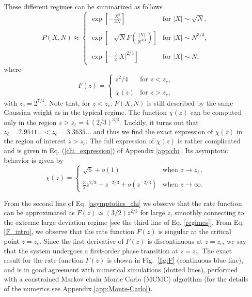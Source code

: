 \documentclass[aps,pre,twocolumn,superscriptaddress,showpacs]{revtex4-1}
\newcommand{\be}{\begin{equation}}
\newcommand{\ee}{\end{equation}}
\begin{document}
These different regimes can be summarized as follows
\be
P(X,N)\approx
\begin{cases}
\exp\left[-\frac{ X^2}{4  N}\right]& \text{for } |X|\sim \sqrt{N},\\
\\

\exp\left[-\sqrt{N}F \left(\frac{ |X|}{ N^{3/4}}\right) \right]& \text{for } |X|\sim N^{3/4},\\
\\
\exp\left[-\frac{3}{2} {|X|}^{2/3}\right]& \text{for } |X|\sim N,
\end{cases}
\label{regimes}
\ee
where 
\be
F(z)=
\begin{cases}
z^2/4 & \text{for } z<z_c,\\
\\
\chi(z) & \text{for } z>z_c,
\end{cases}
\label{F_intro}
\ee
with $z_c= 2^{7/4}$. Note that, for $z<z_c$, $P(X,N)$ is still described by the same Gaussian weight as in the typical regime. The function $\chi(z)$ can be computed only in the region $z>z_{\ell}=4 ~(2/3)^{3/4}$. Luckily, it turns out that $z_{\ell}=2.9511\ldots<z_c=3.3635\ldots$ and thus we find the exact expression of $\chi(z)$ in the region of interest $z>z_c$.
The full expression of $\chi(z)$ is rather complicated and is given in Eq. (\ref{chi_expression}) of Appendix \ref{app:chi}. Its asymptotic behavior is given by 
\be
\chi(z)=
\begin{cases}
\sqrt{6} +o(1)& \text{when } z\to z_{\ell}\,, \\
\\
\frac32 z^{2/3}- z^{-2/3}+o(z^{-2/3})& \text{when } z\to \infty.
\end{cases}
\label{asymptotics_chi}
\ee

From the second line of Eq. \eqref{asymptotics_chi} we observe that
the rate function can be approximated as $F(z)\simeq (3/2)z^{2/3}$ for
large $z$, smoothly connecting to the extreme large deviation regime
[see the third line of Eq. \eqref{regimes}]. From Eq. \eqref{F_intro},
we observe that the rate function $F(z)$ is singular at the critical
point $z=z_c$. Since the first derivative of $F(z)$ is discontinuous
at $z=z_c$, we say that the system undergoes a first-order phase
transition at $z=z_c$. The exact result for the rate function
$F(z)$ is shown in Fig.~\eqref{fig:F} (continuous blue line), and is in good agreement with numerical simulations (dotted lines), performed with a constrained Markov chain Monte Carlo (MCMC) algorithm (for the details of the
numerics see Appendix \ref{app:Monte-Carlo}).
\end{document}
